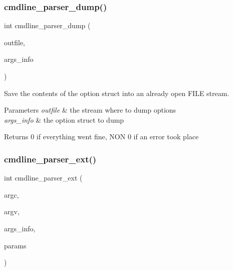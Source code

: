 \subsubsection{\texorpdfstring{cmdline\+\_\+parser\+\_\+dump()}{cmdline\_parser\_dump()}}
{\footnotesize\ttfamily int cmdline\+\_\+parser\+\_\+dump (\begin{DoxyParamCaption}\item[{F\+I\+LE $\ast$}]{outfile,  }\item[{struct \hyperlink{structgengetopt__args__info}{gengetopt\+\_\+args\+\_\+info} $\ast$}]{args\+\_\+info }\end{DoxyParamCaption})}

Save the contents of the option struct into an already open F\+I\+LE stream. 
\begin{DoxyParams}{Parameters}
{\em outfile} & the stream where to dump options \\
\hline
{\em args\+\_\+info} & the option struct to dump \\
\hline
\end{DoxyParams}
\begin{DoxyReturn}{Returns}
0 if everything went fine, N\+ON 0 if an error took place 
\end{DoxyReturn}
\mbox{\label{aes-getopt_8h_ac7bb5d76f3f56d1c0b3b531f11ac6f07}} 
\subsubsection{\texorpdfstring{cmdline\+\_\+parser\+\_\+ext()}{cmdline\_parser\_ext()}}
{\footnotesize\ttfamily int cmdline\+\_\+parser\+\_\+ext (\begin{DoxyParamCaption}\item[{int}]{argc,  }\item[{char $\ast$$\ast$}]{argv,  }\item[{struct \hyperlink{structgengetopt__args__info}{gengetopt\+\_\+args\+\_\+info} $\ast$}]{args\+\_\+info,  }\item[{struct \hyperlink{structcmdline__parser__params}{cmdline\+\_\+parser\+\_\+params} $\ast$}]{params }\end{DoxyParamCaption})}


